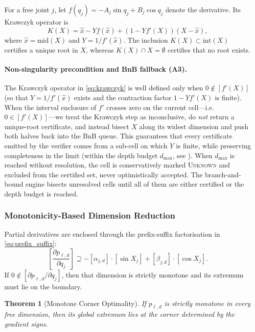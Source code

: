 \documentclass[journal]{IEEEtran}
\newtheorem{theorem}{Theorem}
\begin{document}
For a free joint $j$, let
$f(q_j) = -A_j\sin q_j + B_j\cos q_j$ denote the derivative. Its
Krawczyk operator is
\begin{equation}\label{eq:krawczyk}
  K(X) = \hat{x} - Yf(\hat{x}) + (1 - Yf'(X))(X - \hat{x}),
\end{equation}
where $\hat{x} = \mathrm{mid}(X)$ and $Y = 1/f'(\hat{x})$.
The inclusion $K(X) \subset \mathrm{int}(X)$ certifies a unique root in
$X$, whereas $K(X) \cap X = \emptyset$ certifies that no root exists.

\paragraph{Non-singularity precondition and BnB fallback (A3).}
The Krawczyk operator in \eqref{eq:krawczyk} is well defined only when
$0\notin[f'(X)]$ (so that $Y=1/f'(\hat{x})$ exists and the contraction
factor $1-Yf'(X)$ is finite). When the interval enclosure of $f'$
crosses zero on the current cell---i.e. $0\in[f'(X)]$---we treat the
Krawczyk step as inconclusive, do \emph{not} return a unique-root
certificate, and instead bisect $X$ along its widest dimension and
push both halves back into the BnB queue. This guarantees that every
certificate emitted by the verifier comes from a sub-cell on which
$Y$ is finite, while preserving completeness in the limit (within the
depth budget $d_{\max}$, see ). When $d_{\max}$
is reached without resolution, the cell is conservatively marked
\textsc{Unknown} and excluded from the certified set, never
optimistically accepted.
The branch-and-bound engine bisects unresolved cells until all of them
are either certified or the depth budget is reached.

\subsubsection{Monotonicity-Based Dimension Reduction}

Partial derivatives are enclosed through the prefix-suffix factorisation
in \eqref{eq:prefix_suffix}:
\begin{equation}\label{eq:mono_test}
  \left[\frac{\partial p_{\ell,d}}{\partial q_j}\right]
  \supseteq -[\alpha_{j,d}]\cdot[\sin X_j]
  + [\beta_{j,d}]\cdot[\cos X_j].
\end{equation}
If $0 \notin [\partial p_{\ell,d}/\partial q_j]$, then that dimension is
strictly monotone and its extremum must lie on the boundary.

\begin{theorem}[Monotone Corner Optimality]\label{thm:monotone}
If $p_{\ell,d}$ is strictly monotone in every free dimension, then its
global extremum lies at the corner determined by the gradient signs.
\end{theorem}
\end{document}
